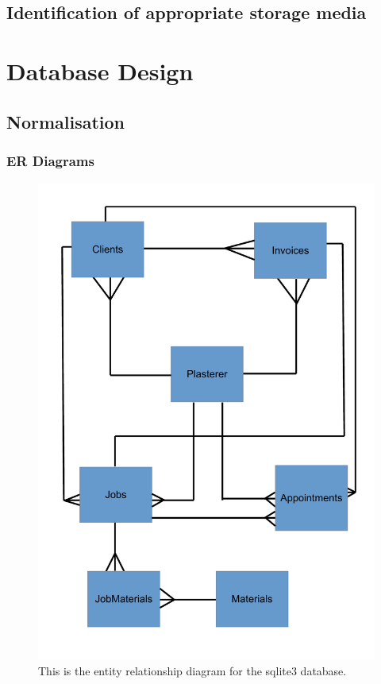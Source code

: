 \subsection{Identification of appropriate storage media}

\section{Database Design}

\subsection{Normalisation}

\pagebreak
\subsubsection{ER Diagrams}

\begin{figure}[H]
    \includegraphics[width=\textwidth]{./Design/images/ERDiagram.pdf}
    \caption{This is the entity relationship diagram for the sqlite3 database.} \label{fig:Entity_Relationship_Diagram}
\end{figure}

